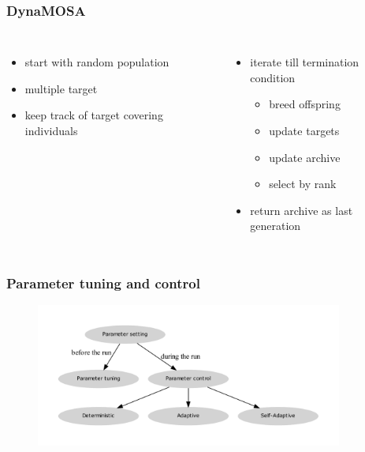 \begin{frame}
	\frametitle{DynaMOSA}
	
	\begin{columns}[c]
		
		
		\begin{itemize}
			\item start with random population
			\item multiple target
			\item keep track of target covering individuals
		\end{itemize}
		
		
		\begin{itemize}
			\item iterate till termination condition
			\begin{itemize}
				\item breed offspring
				\item update targets
				\item update archive
				\item select by rank
			\end{itemize}
			\item return archive as last generation
		\end{itemize}	
		
	\end{columns}
	
\end{frame}

\begin{frame}
	\frametitle{Parameter tuning and control}
	
	\begin{figure}
		\includegraphics[width=0.9\textwidth]{figures/flowchart_parameter_control}
	\end{figure}
	\cite{Eiben.1999}
	
\end{frame}